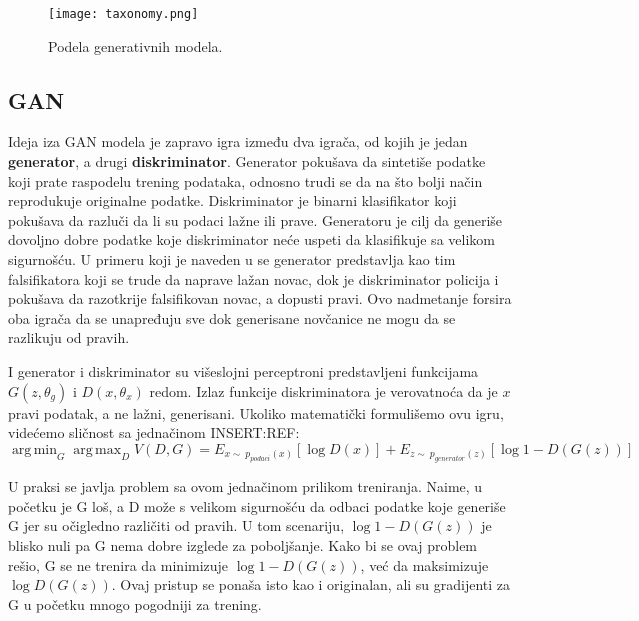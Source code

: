 \documentclass[a4paper]{article}
\DeclareMathOperator*{\argmax}{arg\,max}
\DeclareMathOperator*{\argmin}{arg\,min}
\begin{document}

\begin{figure}
  \centering
  \texttt{[image: taxonomy.png]}
  \caption{Podela generativnih modela.}
  \label{fig:taxonomy}
\end{figure}
    


\subsection{GAN}
Ideja iza GAN modela je zapravo igra između dva igrača, od kojih je jedan \textbf{generator}, a drugi \textbf{diskriminator}. Generator pokušava da sintetiše podatke koji prate raspodelu trening podataka, odnosno trudi se da na što bolji način reprodukuje originalne podatke. Diskriminator je binarni klasifikator koji pokušava da razluči da li su podaci lažne ili prave. Generatoru je cilj da generiše dovoljno dobre podatke koje diskriminator neće uspeti da klasifikuje sa velikom sigurnošću. U primeru koji je naveden u \cite{goodfellow2014generative} se generator predstavlja kao tim falsifikatora koji se trude da naprave lažan novac, dok je diskriminator policija i pokušava da razotkrije falsifikovan novac, a dopusti pravi. Ovo nadmetanje forsira oba igrača da se unapređuju sve dok generisane novčanice ne mogu da se razlikuju od pravih.   

I generator i diskriminator su višeslojni perceptroni predstavljeni funkcijama $G(z,\theta_{g})$ i $D(x, \theta_{x})$ redom. Izlaz funkcije diskriminatora je verovatnoća da je $x$ pravi podatak, a ne lažni, generisani. 
Ukoliko matematički formulišemo ovu igru, videćemo sličnost sa jednačinom INSERT:REF:
$$\argmin_{G}\argmax_{D}V(D,G) = E_{x \sim\ p_{podaci}(x)}[\log{D(x)}] + E_{z \sim\ p_{generator}(z)}[\log{1-D(G(z))}]$$

U praksi se javlja problem sa ovom jednačinom prilikom treniranja. Naime, u početku je G loš, a D može s velikom sigurnošću da odbaci podatke koje generiše G jer su očigledno različiti od pravih. U tom scenariju, $\log{1-D(G(z))}$ je blisko nuli pa G nema dobre izglede za poboljšanje. Kako bi se ovaj problem rešio, G se ne trenira da minimizuje $\log{1-D(G(z))}$, već da maksimizuje $\log{D(G(z))}$. Ovaj pristup se ponaša isto kao i originalan, ali su gradijenti za G u početku mnogo pogodniji za trening.
\end{document}
